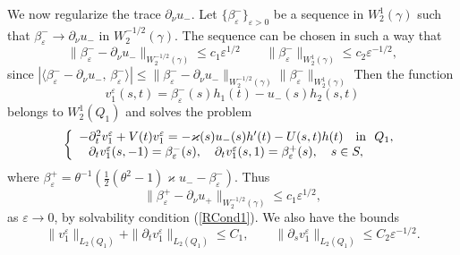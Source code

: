 \documentclass[graybox]{svmult}
\renewcommand{\kappa}{\varkappa}
\newcommand{\eps}{\varepsilon}
\renewcommand{\leq}{\leqslant}
\newcommand{\eqref}[1]{(\ref{#1})}
\newcommand{\pte}{\partial_t}
\begin{document}
We now regularize the trace $\partial_\nu u_-$.  Let $\{\beta_\eps^-\}_{\eps>0}$ be a sequence in $W_2^{1}(\gamma)$ such that $\beta_\eps^-\to  \partial_\nu u_-$ in  $W_2^{-1/2}(\gamma)$.
The sequence can be chosen in such a way that
\begin{equation}\label{EstBetaEps}
  \|\beta_\eps^--\partial_\nu u_-\|_{W_2^{-1/2}(\gamma)}\leq c_1 \eps^{1/2}\qquad   \|\beta_\eps^-\|_{W_2^1(\gamma)}\leq c_2 \eps^{-1/2},
\end{equation}
since $|\langle\beta_\eps^--\partial_\nu u_-,\,\beta_\eps^-\rangle|\leq
\|\beta_\eps^--\partial_\nu u_-\|_{W_2^{-1/2}(\gamma)}\|\beta_\eps^-\|_{W_2^{1}(\gamma)}
$
Then the function
\begin{equation}\label{representV1Eps}
    v_1^\eps(s,t)= \beta_\eps^-(s)h_1(t)-u_-(s)h_2(s,t)
\end{equation}
belongs to $W_2^1(Q_1)$ and solves the problem
\begin{equation}\label{ProblemV1eps}
\left\{
  \begin{array}{ll}
    -\pte^2 v_1^\eps+V(t)v_1^\eps=-\kappa(s)u_-(s)h'(t)-U(s,t)h(t)\quad \hbox{in \ } Q_1, \\
    \phantom{-}\partial_t v_1^\eps(s, -1)=\beta_\eps^-(s), \quad
\partial_t v_1^\eps(s, 1)=\beta_\eps^+(s),\quad s\in S,
  \end{array}
\right.
\end{equation}
where $ \beta_\eps^+=\theta^{-1}
\left(\textstyle\frac{1}{2 }(\theta^2-1)\kappa u_--\beta_\eps^-\right)$.
Thus
\begin{equation}\label{BetaEpsPlus}
  \|\beta_\eps^+-\partial_\nu u_+\|_{W_2^{-1/2}(\gamma)}\leq c_1 \eps^{1/2},
\end{equation}
as $\eps\to 0$, by solvability condition \eqref{RCond1}. We also have the bounds
\begin{equation}\label{DerivOfV1Bounds}
  \|v_1^\eps\|_{L_2(Q_1)}+ \|\partial_t v_1^\eps\|_{L_2(Q_1)}\leq C_1,
   \qquad\|\partial_s v_1^\eps\|_{L_2(Q_1)}\leq C_2\eps^{-1/2}.
\end{equation}
\end{document}
